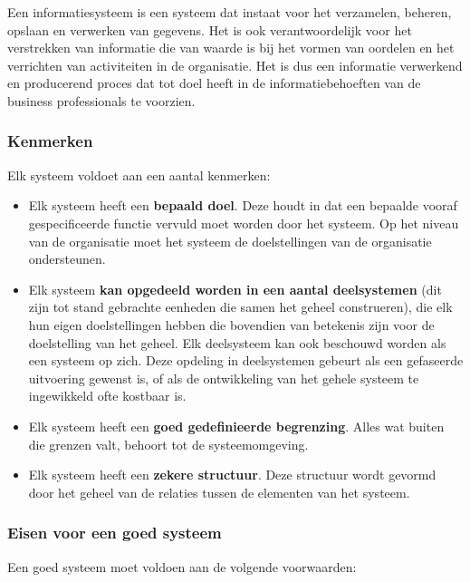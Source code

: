 Een informatiesysteem is een systeem dat instaat voor het verzamelen, beheren, opslaan en verwerken van gegevens. Het is ook verantwoordelijk voor het verstrekken van informatie die van waarde is bij het vormen van oordelen en het verrichten van activiteiten in de organisatie. Het is dus een informatie verwerkend en producerend proces dat tot doel heeft in de informatiebehoeften van de business professionals te voorzien.
\newpage

\subsubsection{Kenmerken}

Elk systeem voldoet aan een aantal kenmerken:

\begin{itemize}
\item Elk systeem heeft een \textbf{bepaald doel}. Deze houdt in dat een bepaalde vooraf gespecificeerde functie vervuld moet worden door het systeem. Op het niveau van de organisatie moet het systeem de doelstellingen van de organisatie ondersteunen.
\item Elk systeem \textbf{kan opgedeeld worden in een aantal deelsystemen} (dit zijn tot stand gebrachte eenheden die samen het geheel construeren), die elk hun eigen doelstellingen hebben die bovendien van betekenis zijn voor de doelstelling van het geheel. Elk deelsysteem kan ook beschouwd worden als een systeem op zich. Deze opdeling in deelsystemen gebeurt als een gefaseerde uitvoering gewenst is, of als de ontwikkeling van het gehele systeem te ingewikkeld ofte kostbaar is.
\item Elk systeem heeft een \textbf{goed gedefinieerde begrenzing}. Alles wat buiten die grenzen valt, behoort tot de systeemomgeving.
\item Elk systeem heeft een \textbf{zekere structuur}. Deze structuur wordt gevormd door het geheel van de relaties tussen de elementen van het systeem.
\end{itemize}

\newpage
\subsubsection{Eisen voor een goed systeem}

Een goed systeem moet voldoen aan de volgende voorwaarden:

